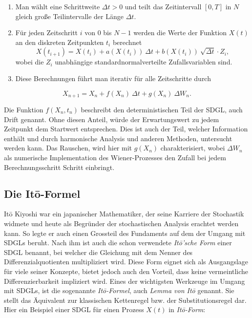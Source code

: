 \begin{enumerate}
	\item Man wählt eine Schrittweite $ \Delta t > 0 $ und teilt das Zeitintervall $ [0, T] $ in $ N $ gleich große Teilintervalle der Länge $ \Delta t $.
	\item Für jeden Zeitschritt $ i $ von $ 0 $ bis $ N-1 $ werden die Werte der Funktion $ X(t) $ an den diskreten Zeitpunkten $ t_i $ berechnet
	\begin{equation}
		X(t_{i+1}) = X(t_i) + a(X(t_i)) \ \Delta t + b(X(t_i)) \ \sqrt{\Delta t} \cdot Z_i,
	\end{equation}
	wobei die $ Z_i $ unabhängige standardnormalverteilte Zufallsvariablen sind.
	\item Diese Berechnungen führt man iterativ für alle Zeitschritte durch
\end{enumerate}

\begin{equation}
	X_{n+1} = X_n + f(X_n) \ \Delta t + g(X_n) \ \Delta W_n .
\end{equation}

Die Funktion $ f(X_n,t_n) $ beschreibt den deterministischen Teil der SDGL, auch Drift genannt. Ohne diesen Anteil, würde der Erwartungswert zu jedem Zeitpunkt dem Startwert entsprechen. Dies ist auch der Teil, welcher Information enthält und durch harmonische Analysis und anderen Methoden, untersucht werden kann. Das Rauschen, wird hier mit $ g(X_n) $ charakterisiert, wobei $ \Delta W_n $ als numerische Implementation des Wiener-Prozesses den Zufall bei jedem Berechnungsschritt Schritt einbringt.



\subsection{Die Itō-Formel\label{brown:ito}}

Itō Kiyoshi war ein japanischer Mathematiker, der seine Karriere der Stochastik widmete und heute als Begründer der stochastischen Analysis erachtet werden kann. So legte er auch einen Grossteil des Fundaments auf dem der Umgang mit SDGLs beruht. Nach ihm ist auch die schon verwendete \textit{Itō'sche Form} einer SDGL benannt, bei welcher die Gleichung mit dem Nenner des Differenzialquotienten multipliziert wird. Diese Form eignet sich als Ausgangslage für viele seiner Konzepte, bietet jedoch auch den Vorteil, dass keine vermeintliche Differenzierbarkeit impliziert wird.
Eines der wichtigsten Werkzeuge im Umgang mit SDGLs, ist die sogenannte \textit{Itō-Formel}, auch \textit{Lemma von Itō} genannt. Sie stellt das Äquivalent zur klassischen Kettenregel bzw. der Substitutionsregel dar. Hier ein Beispiel einer SDGL für einen Prozess $ X(t) $ in \textit{Itō-Form}:

